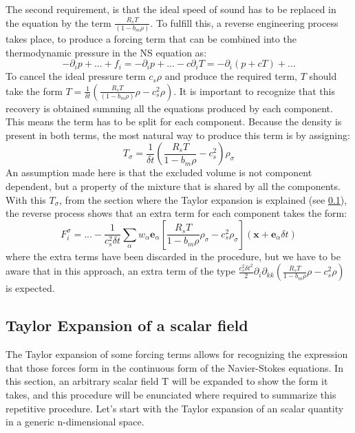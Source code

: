 \documentclass{article}
\newcommand{\locx}{\mathbf{x}}
\newcommand{\vele}{\mathbf{e}_\alpha}
\begin{document}
	The second requirement, is that the ideal speed of sound has to be replaced in the equation by the term $ \frac{R_sT}{(1-b_m \rho)}$. To fulfill this, a reverse engineering process takes place, to produce a forcing term that can be combined into the thermodynamic pressure in the NS equation as:
	\begin{equation*}
		- \partial_i p + ... + f_i = - \partial_i p + ... - c \partial_i T = - \partial_i (p+ c T) + ...
	\end{equation*}
	To cancel the ideal pressure term $c_s \rho$ and produce the required term, $T$ should take the form $T = \frac{1}{\delta t} (\frac{R_sT}{(1-b_m \rho)}\rho - c_s^2 \rho)$. It is important to recognize that this recovery is obtained summing all the equations produced by each component. This means the term has to be split for each component. Because the density is present in both terms, the most natural way to produce this term is by assigning:
	\begin{equation*}
		T_\sigma = \frac{1}{\delta t} (\frac{R_sT}{1-b_m \rho} - c_s^2) \rho_\sigma
	\end{equation*}
	An assumption made here is that the excluded volume is not component dependent, but a property of the mixture that is shared by all the components. With this $T_\sigma$, from the section where the Taylor expansion is explained (see \ref{sec:taylorExpansion}), the reverse process shows that an extra term for each component takes the form:
	\begin{equation}
		F_i^\sigma = ... - \frac{1}{c_s^2 \delta t} \sum_\alpha  w_\alpha \vele [\frac{R_sT}{1-b_m \rho} \rho_\sigma - c_s^2 \rho_\sigma ] ( \locx + \vele \delta t) 
	\end{equation}
	where the extra terms have been discarded in the procedure, but we have to be aware that in this approach, an extra term of the type $\frac{c_s^2 \delta t^2}{2} \partial_i \partial_{kk} (\frac{R_sT}{1-b_m \rho}\rho - c_s^2\rho) $ is expected.

	\subsection{Taylor Expansion of a scalar field}\label{sec:taylorExpansion}
	The Taylor expansion of some forcing terms allows for recognizing the expression that those forces form in the continuous form of the Navier-Stokes equations. In this section, an arbitrary scalar field T will be expanded to show the form it takes, and this procedure will be enunciated where required to summarize this repetitive procedure. Let's start with the Taylor expansion of an scalar quantity in a generic n-dimensional space.
	
\end{document}
